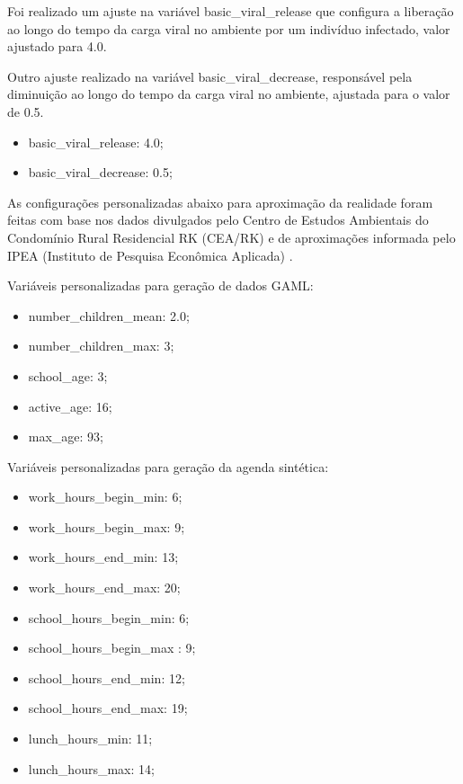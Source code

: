 Foi realizado um ajuste na variável basic\_viral\_release que configura a liberação ao longo do tempo da carga viral no ambiente por um indivíduo infectado, valor ajustado para 4.0.

Outro ajuste realizado na variável basic\_viral\_decrease, responsável pela diminuição ao longo do tempo da carga viral no ambiente, ajustada para o valor de 0.5.

\begin{itemize}
\item basic\_viral\_release: 4.0;
\item basic\_viral\_decrease: 0.5;
\end{itemize}

As configurações personalizadas abaixo para aproximação da realidade foram feitas com base nos dados divulgados pelo Centro de Estudos Ambientais do Condomínio Rural Residencial RK (CEA/RK) e de aproximações informada pelo IPEA (Instituto de Pesquisa Econômica Aplicada) \cite{amorim_carga_2009}.

Variáveis personalizadas para geração de dados GAML:

\begin{itemize}
\item number\_children\_mean: 2.0;
\item number\_children\_max: 3;
\item school\_age: 3;
\item active\_age: 16;
\item max\_age: 93;
\end{itemize}


Variáveis personalizadas para geração da agenda sintética:

\begin{itemize}
\item work\_hours\_begin\_min: 6;
\item work\_hours\_begin\_max: 9;
\item work\_hours\_end\_min: 13; 
\item work\_hours\_end\_max: 20;
\item school\_hours\_begin\_min: 6;
\item school\_hours\_begin\_max : 9;
\item school\_hours\_end\_min: 12;
\item school\_hours\_end\_max: 19;
\item lunch\_hours\_min: 11;
\item lunch\_hours\_max: 14;
\end{itemize}


